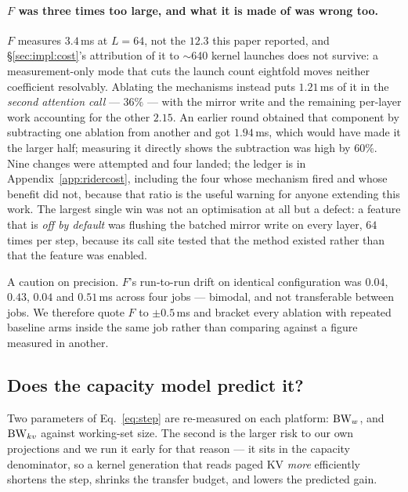 \paragraph{$F$ was three times too large, and what it is made of was wrong too.}
$F$ measures $3.4$\,ms at $L = 64$, not the $12.3$ this paper reported, and
\S\ref{sec:impl:cost}'s attribution of it to $\sim$640 kernel launches does not
survive: a measurement-only mode that cuts the launch count eightfold moves neither
coefficient resolvably. Ablating the mechanisms instead puts $1.21$\,ms of it in
the \emph{second attention call} --- $36\%$ --- with the mirror write and the
remaining per-layer work accounting for the other $2.15$. An earlier round obtained
that component by subtracting one ablation from another and got $1.94$\,ms, which
would have made it the larger half; measuring it directly shows the subtraction was
high by $60\%$. Nine changes were attempted and four
landed; the ledger is in Appendix~\ref{app:ridercost}, including the four whose
mechanism fired and whose benefit did not, because that ratio is the useful warning
for anyone extending this work. The largest single win was not an optimisation at
all but a defect: a feature that is \emph{off by default} was flushing the batched
mirror write on every layer, $64$ times per step, because its call site tested that
the method existed rather than that the feature was enabled.

A caution on precision. $F$'s run-to-run drift on identical configuration was
$0.04$, $0.43$, $0.04$ and $0.51$\,ms across four jobs --- bimodal, and not
transferable between jobs. We therefore quote $F$ to $\pm 0.5$\,ms and bracket
every ablation with repeated baseline arms inside the same job rather than
comparing against a figure measured in another.

\subsection{Does the capacity model predict it?}
\label{sec:eval:model}

Two parameters of Eq.~\ref{eq:step} are re-measured on each platform: $\mathrm{BW}_w$, and
$\mathrm{BW}_{kv}$ against working-set size. The second is the larger risk to our own
projections and we run it early for that reason --- it sits in the capacity
denominator, so a kernel generation that reads paged KV \emph{more} efficiently
shortens the step, shrinks the transfer budget, and lowers the predicted gain.

